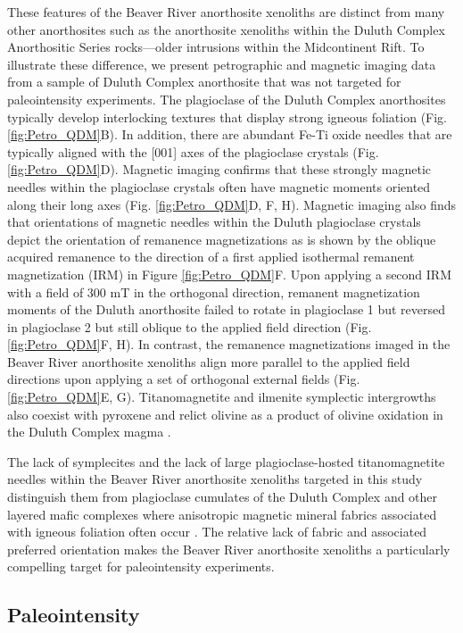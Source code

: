 \documentclass[9pt,twocolumn,twoside,lineno]{pnas-new}
\begin{document}
These features of the Beaver River anorthosite xenoliths are distinct from many other anorthosites such as the anorthosite xenoliths within the Duluth Complex Anorthositic Series rocks---older intrusions within the Midcontinent Rift. To illustrate these difference, we present petrographic and magnetic imaging data from a sample of Duluth Complex anorthosite that was not targeted for paleointensity experiments. The plagioclase of the Duluth Complex anorthosites typically develop interlocking textures that display strong igneous foliation (Fig. \ref{fig:Petro_QDM}B). In addition, there are abundant Fe-Ti oxide needles that are typically aligned with the [001] axes of the plagioclase crystals (Fig. \ref{fig:Petro_QDM}D). Magnetic imaging confirms that these strongly magnetic needles within the plagioclase crystals often have magnetic moments oriented along their long axes (Fig. \ref{fig:Petro_QDM}D, F, H). Magnetic imaging also finds that orientations of magnetic needles within the Duluth plagioclase crystals depict the orientation of remanence magnetizations as is shown by the oblique acquired remanence to the direction of a first applied isothermal remanent magnetization (IRM) in Figure \ref{fig:Petro_QDM}F. Upon applying a second IRM with a field of 300 mT in the orthogonal direction, remanent magnetization moments of the Duluth anorthosite failed to rotate in plagioclase 1 but reversed in plagioclase 2 but still oblique to the applied field direction (Fig. \ref{fig:Petro_QDM}F, H). In contrast, the remanence magnetizations imaged in the Beaver River anorthosite xenoliths align more parallel to the applied field directions upon applying a set of orthogonal external fields (Fig. \ref{fig:Petro_QDM}E, G). Titanomagnetite and ilmenite symplectic intergrowths also coexist with pyroxene and relict olivine as a product of olivine oxidation in the Duluth Complex magma \cite{Miller1990a}.

The lack of symplecites and the lack of large plagioclase-hosted titanomagnetite needles within the Beaver River anorthosite xenoliths targeted in this study distinguish them from plagioclase cumulates of the Duluth Complex and other layered mafic complexes where anisotropic magnetic mineral fabrics associated with igneous foliation often occur \cite{Scofield1986a, Selkin2000a, Feinberg2006a}. The relative lack of fabric and associated preferred orientation makes the Beaver River anorthosite xenoliths a particularly compelling target for paleointensity experiments.

\subsection*{Paleointensity}
\end{document}
